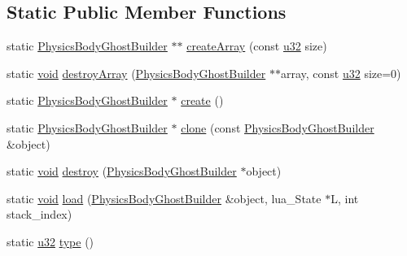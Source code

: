 \subsection*{Static Public Member Functions}
\begin{DoxyCompactItemize}
\item 
static \mbox{\hyperlink{classnjli_1_1_physics_body_ghost_builder}{Physics\+Body\+Ghost\+Builder}} $\ast$$\ast$ \mbox{\hyperlink{classnjli_1_1_physics_body_ghost_builder_a96ba3bbcc01126adbd3e4d53a554b151}{create\+Array}} (const \mbox{\hyperlink{_util_8h_a10e94b422ef0c20dcdec20d31a1f5049}{u32}} size)
\item 
static \mbox{\hyperlink{_thread_8h_af1e856da2e658414cb2456cb6f7ebc66}{void}} \mbox{\hyperlink{classnjli_1_1_physics_body_ghost_builder_aba77f6706afe0860812540eb958c81c4}{destroy\+Array}} (\mbox{\hyperlink{classnjli_1_1_physics_body_ghost_builder}{Physics\+Body\+Ghost\+Builder}} $\ast$$\ast$array, const \mbox{\hyperlink{_util_8h_a10e94b422ef0c20dcdec20d31a1f5049}{u32}} size=0)
\item 
static \mbox{\hyperlink{classnjli_1_1_physics_body_ghost_builder}{Physics\+Body\+Ghost\+Builder}} $\ast$ \mbox{\hyperlink{classnjli_1_1_physics_body_ghost_builder_aceb6f0a62a709dabd4dd0a42d9bc9259}{create}} ()
\item 
static \mbox{\hyperlink{classnjli_1_1_physics_body_ghost_builder}{Physics\+Body\+Ghost\+Builder}} $\ast$ \mbox{\hyperlink{classnjli_1_1_physics_body_ghost_builder_acf64508f874e55455f7b08eb5fd379e3}{clone}} (const \mbox{\hyperlink{classnjli_1_1_physics_body_ghost_builder}{Physics\+Body\+Ghost\+Builder}} \&object)
\item 
static \mbox{\hyperlink{_thread_8h_af1e856da2e658414cb2456cb6f7ebc66}{void}} \mbox{\hyperlink{classnjli_1_1_physics_body_ghost_builder_a652cdb55fc9c23ea1ec55fb8d58b0036}{destroy}} (\mbox{\hyperlink{classnjli_1_1_physics_body_ghost_builder}{Physics\+Body\+Ghost\+Builder}} $\ast$object)
\item 
static \mbox{\hyperlink{_thread_8h_af1e856da2e658414cb2456cb6f7ebc66}{void}} \mbox{\hyperlink{classnjli_1_1_physics_body_ghost_builder_acc77deeeb4e3bb36c1790000223664d7}{load}} (\mbox{\hyperlink{classnjli_1_1_physics_body_ghost_builder}{Physics\+Body\+Ghost\+Builder}} \&object, lua\+\_\+\+State $\ast$L, int stack\+\_\+index)
\item 
static \mbox{\hyperlink{_util_8h_a10e94b422ef0c20dcdec20d31a1f5049}{u32}} \mbox{\hyperlink{classnjli_1_1_physics_body_ghost_builder_a7c64e5d2f7100006b10283248abed043}{type}} ()
\end{DoxyCompactItemize}
